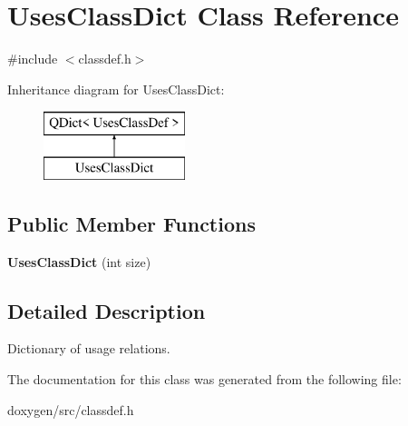 \hypertarget{class_uses_class_dict}{}\section{Uses\+Class\+Dict Class Reference}
\label{class_uses_class_dict}


{\ttfamily \#include $<$classdef.\+h$>$}

Inheritance diagram for Uses\+Class\+Dict\+:\begin{figure}[H]
\begin{center}
\leavevmode
\includegraphics[height=2.000000cm]{class_uses_class_dict}
\end{center}
\end{figure}
\subsection*{Public Member Functions}
\begin{DoxyCompactItemize}
\item 
\mbox{\label{class_uses_class_dict_a4c27099c0db8f9eafb42810d7645d3ec}} 
{\bfseries Uses\+Class\+Dict} (int size)
\end{DoxyCompactItemize}


\subsection{Detailed Description}
Dictionary of usage relations. 

The documentation for this class was generated from the following file\+:\begin{DoxyCompactItemize}
\item 
doxygen/src/classdef.\+h\end{DoxyCompactItemize}
